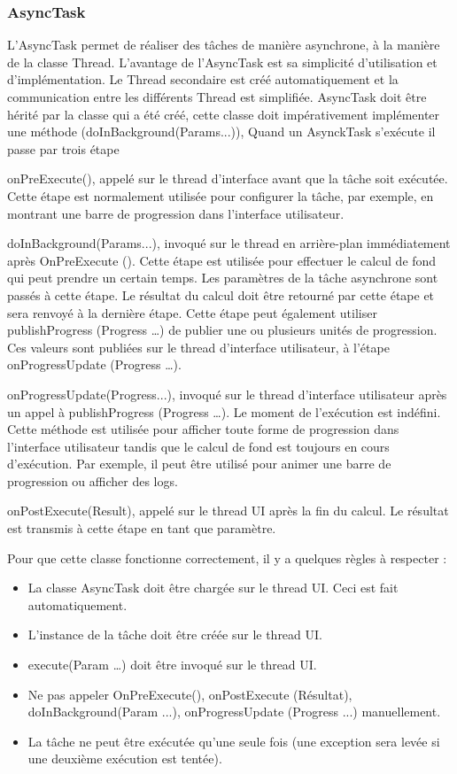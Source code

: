 \subsubsection{AsyncTask}


L’AsyncTask permet de réaliser des tâches de manière asynchrone, à la manière de la classe Thread. L’avantage de l’AsyncTask est sa simplicité d’utilisation et d’implémentation. Le Thread secondaire est créé automatiquement et la communication entre les différents Thread est simplifiée.
AsyncTask doit être hérité par la classe qui a été  créé, cette classe doit impérativement implémenter une méthode (doInBackground(Params...)),
Quand un AsynckTask s'exécute il passe par trois étape 


onPreExecute(), appelé sur le thread d’interface avant que la tâche soit exécutée. Cette étape est normalement utilisée pour configurer la tâche, par exemple, en montrant une barre de progression dans l’interface utilisateur.


doInBackground(Params...), invoqué sur le thread en arrière-plan immédiatement après OnPreExecute (). Cette étape est utilisée pour effectuer le calcul de fond qui peut prendre un certain temps. Les paramètres de la tâche asynchrone sont passés à cette étape. Le résultat du calcul doit être retourné par cette étape et sera renvoyé à la dernière étape. Cette étape peut également utiliser publishProgress (Progress …) de publier une ou plusieurs unités de progression. Ces valeurs sont publiées sur le thread d’interface utilisateur, à l’étape onProgressUpdate (Progress …).


onProgressUpdate(Progress...), invoqué sur le thread d’interface utilisateur après un appel à publishProgress (Progress …). Le moment de l’exécution est indéfini. Cette méthode est utilisée pour afficher toute forme de progression dans l’interface utilisateur tandis que le calcul de fond est toujours en cours d’exécution. Par exemple, il peut être utilisé pour animer une barre de progression ou afficher des logs.


onPostExecute(Result), appelé sur le thread UI après la fin du calcul. Le résultat est transmis à cette étape en tant que paramètre.
 
Pour que cette classe fonctionne correctement, il y a quelques règles à respecter :


\begin{itemize}
    \item La classe AsyncTask doit être chargée sur le thread UI. Ceci est fait automatiquement.
    \item L’instance de la tâche doit être créée sur le thread UI.
    \item execute(Param …) doit être invoqué sur le thread UI.
    \item Ne pas appeler OnPreExecute(), onPostExecute (Résultat), doInBackground(Param ...),  onProgressUpdate (Progress ...) manuellement.
    \item La tâche ne peut être exécutée qu’une seule fois (une exception sera levée si une deuxième exécution est tentée).
\end{itemize}\cite{asyncTask} 
 
